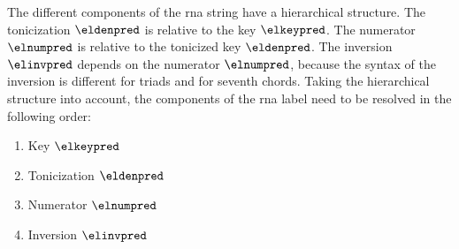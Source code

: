 
The different components of the \gls{rna} string have a
hierarchical structure. The tonicization $\eldenpred$ is
relative to the key $\elkeypred$. The numerator $\elnumpred$
is relative to the tonicized key $\eldenpred$. The inversion
$\elinvpred$ depends on the numerator $\elnumpred$, because
the syntax of the inversion is different for triads and for
seventh chords. Taking the hierarchical structure into
account, the components of the \gls{rna} label need to be
resolved in the following order:

\begin{enumerate} 
    \item Key $\elkeypred$ 
    \item Tonicization $\eldenpred$ 
    \item Numerator $\elnumpred$ 
    \item Inversion $\elinvpred$ 
\end{enumerate}




